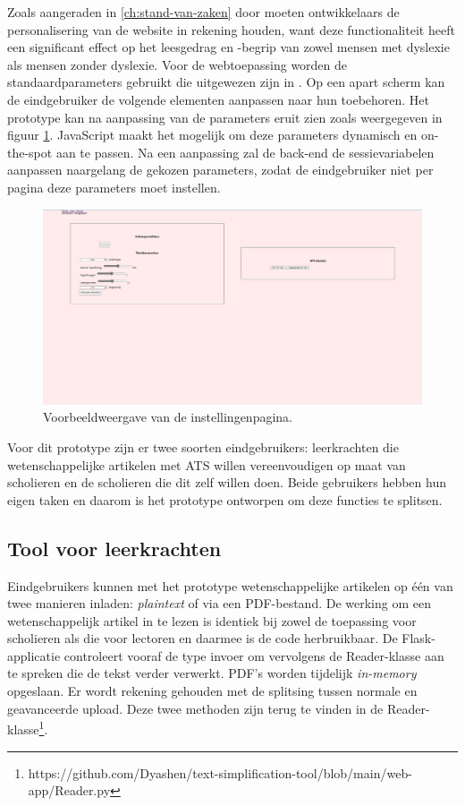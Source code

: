 \medspace

Zoals aangeraden in \ref{ch:stand-van-zaken} door \textcite{Harvard2023} moeten ontwikkelaars de personalisering van de website in rekening houden, want deze functionaliteit heeft een significant effect op het leesgedrag en -begrip van zowel mensen met dyslexie als mensen zonder dyslexie. Voor de webtoepassing worden de standaardparameters gebruikt die uitgewezen zijn in \textcite{Rello2013a, Rello2013b}. Op een apart scherm kan de eindgebruiker de volgende elementen aanpassen naar hun toebehoren. Het prototype kan na aanpassing van de parameters eruit zien zoals weergegeven in figuur \ref{img:website-instellingen}. JavaScript maakt het mogelijk om deze parameters dynamisch en on-the-spot aan te passen. Na een aanpassing zal de back-end de sessievariabelen aanpassen naargelang de gekozen parameters, zodat de eindgebruiker niet per pagina deze parameters moet instellen.

\begin{figure}
	\includegraphics{img/website-instellingen.png}
	\caption{Voorbeeldweergave van de instellingenpagina.}
	\label{img:website-instellingen}
\end{figure}

Voor dit prototype zijn er twee soorten eindgebruikers: leerkrachten die wetenschappelijke artikelen met ATS willen vereenvoudigen op maat van scholieren en de scholieren die dit zelf willen doen. Beide gebruikers hebben hun eigen taken en daarom is het prototype ontworpen om deze functies te splitsen.

\subsection{Tool voor leerkrachten}

\medspace

Eindgebruikers kunnen met het prototype wetenschappelijke artikelen op één van twee manieren inladen: \textit{plaintext} of via een PDF-bestand. De werking om een wetenschappelijk artikel in te lezen is identiek bij zowel de toepassing voor scholieren als die voor lectoren en daarmee is de code herbruikbaar. De Flask-applicatie controleert vooraf de type invoer om vervolgens de Reader-klasse aan te spreken die de tekst verder verwerkt. PDF's worden tijdelijk \textit{in-memory} opgeslaan. Er wordt rekening gehouden met de splitsing tussen normale en geavanceerde upload. Deze twee methoden zijn terug te vinden in de Reader-klasse\footnote{https://github.com/Dyashen/text-simplification-tool/blob/main/web-app/Reader.py}.

